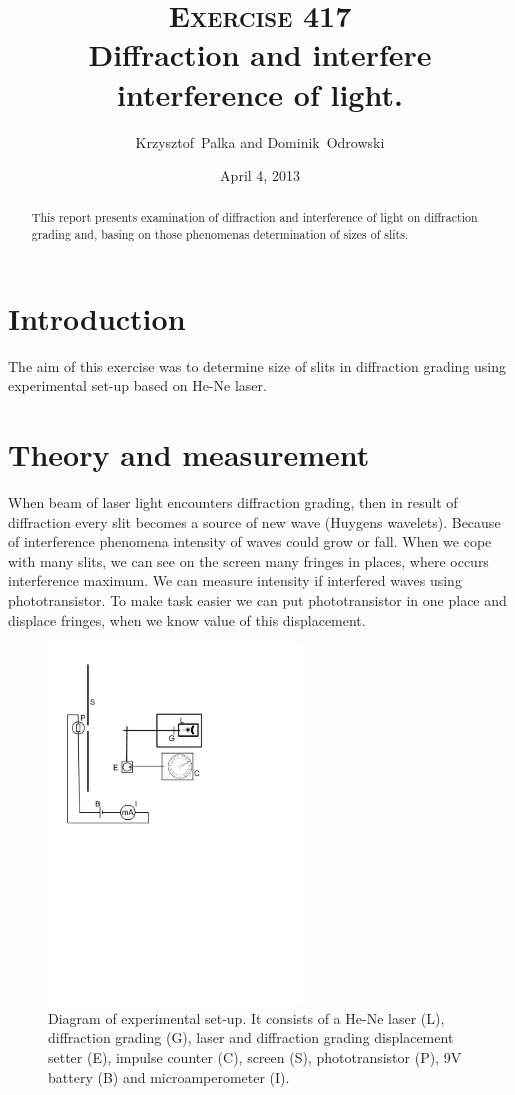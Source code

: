 \documentclass[a4paper,12pt]{article}
\author{Krzysztof~Palka and Dominik~Odrowski}
\date{April 4, 2013}
\title{\textsc{Exercise} 417 \\ Diffraction and interfere interference of light.}
\begin{document}
\maketitle

\begin{abstract}
This report presents examination of diffraction and interference of light on diffraction grading and, basing on those phenomenas determination of sizes of slits.  
\end{abstract}

\section{Introduction}
The aim of this exercise was to determine size of slits in diffraction grading using experimental set-up based on He-Ne laser.

\section{Theory and measurement}
When beam of laser light encounters diffraction grading, then in result of diffraction every slit becomes a source of new wave (Huygens wavelets). Because of interference phenomena intensity of waves could grow or fall. When we cope with many slits, we can see on the screen many fringes in places, where occurs interference maximum. We can measure intensity if interfered waves using phototransistor. To make task easier we can put phototransistor in one place and displace fringes, when we know value of this displacement. 

\begin{figure}[H]
\begin{center}
    \includegraphics[width=0.6\textwidth]{set-up}
    \caption{Diagram of experimental set-up. It consists of a He-Ne laser (L), diffraction grading (G), laser and diffraction grading displacement setter (E), impulse counter (C), screen (S), phototransistor (P), 9V battery (B) and microamperometer (I).}
    \label{fig:set-up}
\end{center}
\end{figure}
\end{document}
